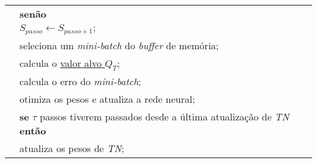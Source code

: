 \begin{tabular}{l l}
 & \qquad \qquad \textbf{senão}\\
 & \qquad \qquad \qquad $S_{passo} \leftarrow S_{passo+1};$ \\
 & \qquad \qquad seleciona um \textit{mini-batch} do \textit{buffer} de memória;\\
 & \qquad \qquad calcula o \hyperref[eq:q_target]{valor alvo $Q_{T}$};\\
 & \qquad \qquad calcula o erro do \textit{mini-batch};\\
 & \qquad \qquad otimiza os pesos e atualiza a rede neural;\\
 & \qquad \qquad \textbf{se} $\tau$ passos tiverem passados desde a última atualização de \textit{TN} \textbf{então}\\
 & \qquad \qquad \qquad atualiza os pesos de \textit{TN};\\
\hline
\end{tabular}


